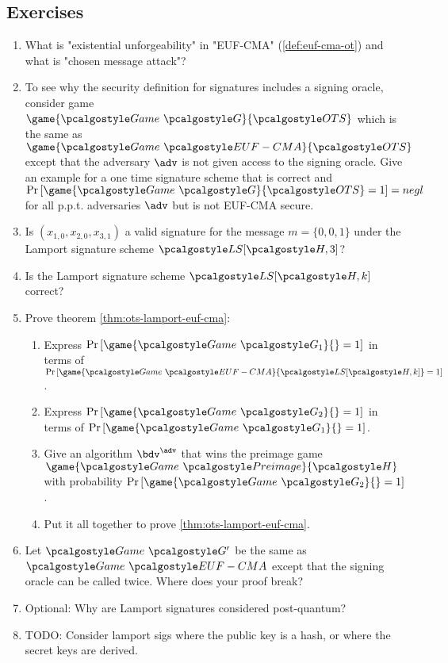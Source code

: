 \subsection{Exercises}
\begin{enumerate}
    \item What is "existential unforgeability" in "EUF-CMA" (\autoref{def:euf-cma-ot}) and what is "chosen message attack"?
    \item To see why the security definition for signatures includes a signing oracle, consider game $\game{\Game~\algo{G}}{\algo{OTS}}$ which is the same as $\game{\Game~\algo{EUF-CMA}}{\algo{OTS}}$ except that the adversary $\adv$ is not given access to the signing oracle.
          Give an example for a one time signature scheme that is correct and $\pr{\game{\Game~\algo{G}}{\algo{OTS}} = 1} = negl$ for all p.p.t. adversaries $\adv$ but is not EUF-CMA secure.
    \item Is $(x_{1,0}, x_{2,0}, x_{3,1})$ a valid signature for the message $m = \{0, 0, 1\}$ under the Lamport signature scheme $\algo{LS}[\algo{H, 3}]$?
    \item Is the Lamport signature scheme $\algo{LS}[\algo{H, k}]$ correct?
    \item Prove theorem \autoref{thm:ots-lamport-euf-cma}:
        \begin{enumerate}
            \item Express $\pr{\game{\Game~\algo{G_1}}{} = 1}$ in terms of $\pr{\game{\Game~\algo{EUF-CMA}}{\algo{LS[\algo{H}, k]}} = 1}$.
            \item Express $\pr{\game{\Game~\algo{G_2}}{} = 1}$ in terms of $\pr{\game{\Game~\algo{G_1}}{} = 1}$.
            \item Give an algorithm $\bdv^\adv$ that wins the preimage game $\game{\Game~\algo{Preimage}}{\algo{H}}$ with probability $\pr{\game{\Game~\algo{G_2}}{} = 1}$.
            \item Put it all together to prove \autoref{thm:ots-lamport-euf-cma}.
        \end{enumerate}
    \item Let $\Game~\algo{G'}$ be the same as $\Game~\algo{EUF-CMA}$ except that the signing oracle can be called twice. Where does your proof break?
    \item Optional: Why are Lamport signatures considered post-quantum?
    \item TODO: Consider lamport sigs where the public key is a hash, or where the secret keys are derived.
\end{enumerate}


